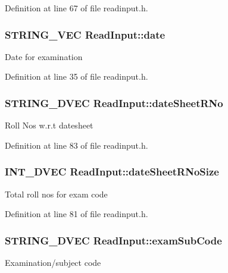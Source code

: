 Definition at line 67 of file readinput.\-h.

\hypertarget{classReadInput_a3e8d6a0fef698a51e38fc06be401c390}{
\subsubsection[{date}]{\setlength{\rightskip}{0pt plus 5cm}S\-T\-R\-I\-N\-G\-\_\-\-V\-E\-C Read\-Input\-::date\hspace{0.3cm}{\ttfamily [protected]}}}\label{classReadInput_a3e8d6a0fef698a51e38fc06be401c390}
Date for examination 

Definition at line 35 of file readinput.\-h.

\hypertarget{classReadInput_ab3a09915476fba776592d85dff52187d}{
\subsubsection[{date\-Sheet\-R\-No}]{\setlength{\rightskip}{0pt plus 5cm}S\-T\-R\-I\-N\-G\-\_\-D\-V\-E\-C Read\-Input\-::date\-Sheet\-R\-No\hspace{0.3cm}{\ttfamily [protected]}}}\label{classReadInput_ab3a09915476fba776592d85dff52187d}
Roll Nos w.\-r.\-t datesheet 

Definition at line 83 of file readinput.\-h.

\hypertarget{classReadInput_aa56be8b352098aff43c904982b3bc2b8}{
\subsubsection[{date\-Sheet\-R\-No\-Size}]{\setlength{\rightskip}{0pt plus 5cm}I\-N\-T\-\_\-D\-V\-E\-C Read\-Input\-::date\-Sheet\-R\-No\-Size\hspace{0.3cm}{\ttfamily [protected]}}}\label{classReadInput_aa56be8b352098aff43c904982b3bc2b8}
Total roll nos for exam code 

Definition at line 81 of file readinput.\-h.

\hypertarget{classReadInput_a81eee5f7478e5d2d76afad814a6c4e3e}{
\subsubsection[{exam\-Sub\-Code}]{\setlength{\rightskip}{0pt plus 5cm}S\-T\-R\-I\-N\-G\-\_\-D\-V\-E\-C Read\-Input\-::exam\-Sub\-Code\hspace{0.3cm}{\ttfamily [protected]}}}\label{classReadInput_a81eee5f7478e5d2d76afad814a6c4e3e}
Examination/subject code 

